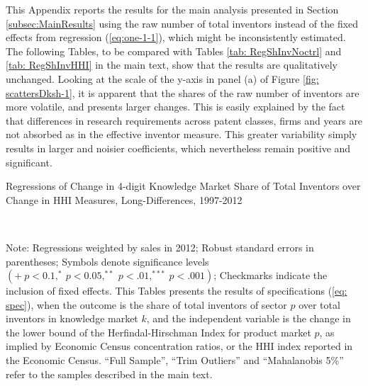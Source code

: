 This Appendix reports the results for the main analysis presented
in Section \ref{subsec:MainResults} using the raw number of total
inventors instead of the fixed effects from regression (\ref{eq:one-1-1}),
which might be inconsistently estimated. The following Tables, to
be compared with Tables \ref{tab: RegShInvNoctrl} and \ref{tab: RegShInvHHI}
in the main text, show that the results are qualitatively unchanged.
Looking at the scale of the y-axis in panel (a) of Figure \ref{fig: scattersDksh-1},
it is apparent that the shares of the raw number of inventors are
more volatile, and presents larger changes. This is easily explained
by the fact that differences in research requirements across patent
classes, firms and years are not absorbed as in the effective inventor
measure. This greater variability simply results in larger and noisier
coefficients, which nevertheless remain positive and significant.
\begin{table}
\caption{Regressions of Change in 4-digit Knowledge Market Share of Total Inventors
over Change in HHI Measures, Long-Differences, 1997-2012\label{tab: RegShInvNoctrl-1-1}}

\begin{centering}
\scalebox{.9}{}\\
\par\end{centering}
\raggedright{}{\small{}Note: Regressions weighted by sales in 2012;
Robust standard errors in parentheses; Symbols denote significance
levels $\left(+\ p<0.1,^{*}\ p<0.05,^{**}\ p<.01,^{***}\ p<.001\right)$;
Checkmarks indicate the inclusion of fixed effects. This Tables presents
the results of specifications (\ref{eq: spec}), when the outcome
is the share of total inventors of sector $p$ over total inventors
in knowledge market $k$, and the independent variable is the change
in the lower bound of the Herfindal-Hirschman Index for product market
$p$, as implied by Economic Census concentration ratios, or the HHI
index reported in the Economic Census. ``Full Sample'', ``Trim
Outliers'' and ``Mahalanobis 5\%'' refer to the samples described
in the main text.}{\small\par}
\end{table}
